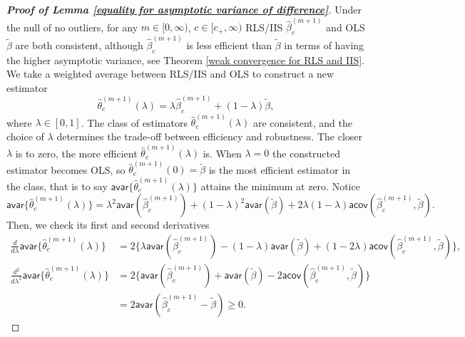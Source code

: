 \documentclass[11pt, letterpaper]{article}
\numberwithin{algorithm}{section}
\numberwithin{assumption}{section}
\numberwithin{lemma}{section}
\numberwithin{theorem}{section}
\numberwithin{corollary}{section}
\numberwithin{remark}{section}
\numberwithin{equation}{section}
\numberwithin{figure}{section}
\numberwithin{table}{section}
\begin{document}
\begin{proof}[\textnormal{\textbf{Proof of Lemma \ref{equality for asymptotic variance of difference}}}]
Under the null of no outliers, for any $m \in [0, \infty)$, $c \in [c_{+}, \infty)$ RLS/IIS $\widehat{\beta}_{c}^{(m + 1)}$ and OLS $\widetilde{\beta}$ are both consistent, although $\widehat{\beta}_{c}^{(m + 1)}$ is less efficient than $\widetilde{\beta}$ in terms of having the higher asymptotic variance, see Theorem \ref{weak convergence for RLS and IIS}. We take a weighted average between RLS/IIS and OLS to construct a new estimator
\begin{equation*}
\widehat{\theta}_{c}^{(m + 1)}(\lambda) = \lambda \widehat{\beta}_{c}^{(m + 1)} + (1 - \lambda) \widetilde{\beta},
\end{equation*}
where $\lambda \in [0, 1]$. The class of estimators $\widehat{\theta}_{c}^{(m + 1)}(\lambda)$ are consistent, and the choice of $\lambda$ determines the trade-off between efficiency and robustness. The closer $\lambda$ is to zero, the more efficient $\widehat{\theta}_{c}^{(m + 1)}(\lambda)$ is. When $\lambda = 0$ the constructed estimator becomes OLS, so $\widehat{\theta}_{c}^{(m + 1)}(0) = \widetilde{\beta}$ is the most efficient estimator in the class, that is to say $\mathsf{avar} \{ \widehat{\theta}_{c}^{(m + 1)}(\lambda) \}$ attains the minimum at zero. Notice
\begin{equation*}
\mathsf{avar} \{ \widehat{\theta}_{c}^{(m + 1)}(\lambda) \} = \lambda^{2} \mathsf{avar} (\widehat{\beta}_{c}^{(m + 1)}) + (1 - \lambda)^{2} \mathsf{avar} (\widetilde{\beta}) + 2 \lambda (1 - \lambda) \mathsf{acov} (\widehat{\beta}_{c}^{(m + 1)}, \widetilde{\beta}).
\end{equation*}
Then, we check its first and second derivatives
\begin{align*}
\frac{d}{d \lambda} \mathsf{avar} \{ \widehat{\theta}_{c}^{(m + 1)}(\lambda) \} & = 2 \{ \lambda \mathsf{avar} (\widehat{\beta}_{c}^{(m + 1)}) - (1 - \lambda) \mathsf{avar} (\widetilde{\beta}) + (1 - 2 \lambda) \mathsf{acov} (\widehat{\beta}_{c}^{(m + 1)}, \widetilde{\beta}) \}, \\
\frac{d^{2}}{d \lambda^{2}} \mathsf{avar} \{ \widehat{\theta}_{c}^{(m + 1)}(\lambda) \} & = 2 \{ \mathsf{avar} (\widehat{\beta}_{c}^{(m + 1)}) + \mathsf{avar} (\widetilde{\beta}) -2 \mathsf{acov} (\widehat{\beta}_{c}^{(m + 1)}, \widetilde{\beta}) \} \\
& = 2 \mathsf{avar} (\widehat{\beta}_{c}^{(m + 1)} - \widetilde{\beta}) \ge 0.
\end{align*}

\end{proof}
\end{document}
